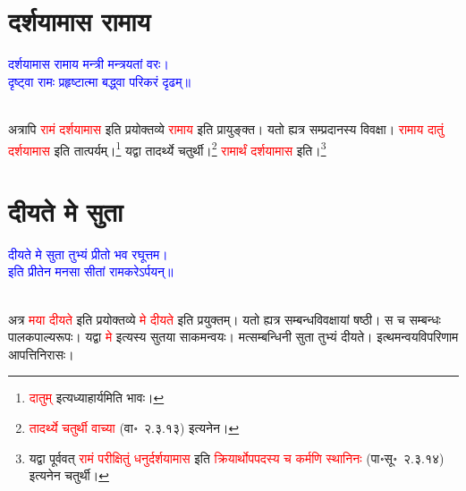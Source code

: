 \section[दर्शयामास रामाय]{दर्शयामास रामाय}
\centering\textcolor{blue}{दर्शयामास रामाय मन्त्री मन्त्रयतां वरः।\nopagebreak\\
दृष्ट्वा रामः प्रहृष्टात्मा बद्ध्वा परिकरं दृढम्॥}\nopagebreak\\
\\
\begin{sloppypar}\justifying\noindent\hspace{10mm} अत्रापि \textcolor{red}{रामं दर्शयामास} इति प्रयोक्तव्ये \textcolor{red}{रामाय} इति प्रायुङ्क्त। यतो ह्यत्र सम्प्रदानस्य विवक्षा। \textcolor{red}{रामाय दातुं दर्शयामास} इति तात्पर्यम्।\footnote{\textcolor{red}{दातुम्} इत्यध्याहार्यमिति भावः।} यद्वा तादर्थ्ये चतुर्थी।\footnote{\textcolor{red}{तादर्थ्ये चतुर्थी वाच्या} (वा॰~२.३.१३) इत्यनेन।} \textcolor{red}{रामार्थं दर्शयामास} इति।\footnote{यद्वा पूर्ववत् \textcolor{red}{रामं परीक्षितुं धनुर्दर्शयामास} इति \textcolor{red}{क्रियार्थोपपदस्य च कर्मणि स्थानिनः} (पा॰सू॰~२.३.१४) इत्यनेन चतुर्थी।}\end{sloppypar}
\section[दीयते मे सुता]{दीयते मे सुता}
\centering\textcolor{blue}{दीयते मे सुता तुभ्यं प्रीतो भव रघूत्तम।\nopagebreak\\
इति प्रीतेन मनसा सीतां रामकरेऽर्पयन्॥}\nopagebreak\\
\\
\begin{sloppypar}\justifying\noindent\hspace{10mm} अत्र \textcolor{red}{मया दीयते} इति प्रयोक्तव्ये \textcolor{red}{मे दीयते} इति प्रयुक्तम्। यतो ह्यत्र सम्बन्ध\-विवक्षायां षष्ठी। स च सम्बन्धः पालक\-पाल्य\-रूपः। यद्वा \textcolor{red}{मे} इत्यस्य सुतया साकमन्वयः। मत्सम्बन्धिनी सुता तुभ्यं दीयते।
इत्थमन्वय\-विपरिणाम आपत्ति\-निरासः।\end{sloppypar}
